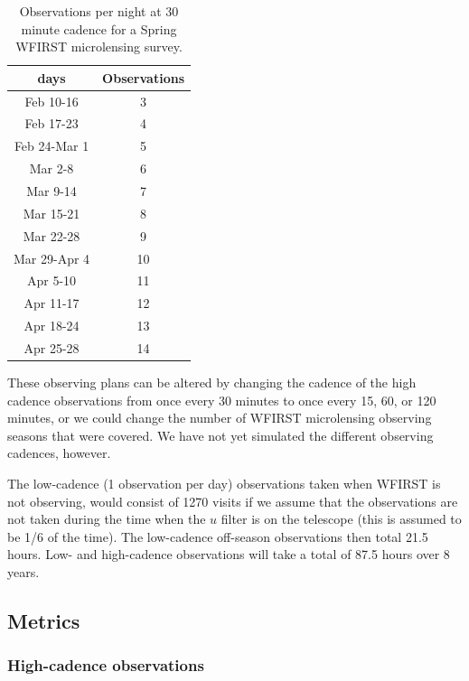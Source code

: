 \begin{table}
\begin{tabular}{ c c }
{\bf days} & {\bf Observations} \\
\hline
Feb 10-16     &  3 \\
Feb 17-23     &  4 \\
Feb 24-Mar 1  &  5 \\
Mar 2-8       &  6 \\
Mar 9-14      &  7 \\
Mar 15-21     &  8 \\
Mar 22-28     &  9 \\
Mar 29-Apr 4  & 10 \\
Apr 5-10      & 11 \\
Apr 11-17     & 12 \\
Apr 18-24     & 13 \\
Apr 25-28     & 14 \\
\end{tabular}
\caption{Observations per night at 30 minute cadence for a Spring
WFIRST microlensing survey.}
\label{tab:wfirst_ml_survey}
\end{table}

These observing plans can be altered by changing the cadence of the high
cadence observations from once every 30 minutes to once every 15, 60,
or 120 minutes, or we could change the number of WFIRST microlensing
observing seasons that were covered. We have not yet simulated the
different observing cadences, however.

The low-cadence (1 observation per day) observations taken when WFIRST
is not observing, would consist of 1270 visits if we assume that
the observations are not taken during the time when the $u$ filter is
on the telescope (this is assumed to be 1/6 of the time). The low-cadence
off-season observations then total 21.5 hours. Low- and high-cadence
observations will take a total of 87.5 hours over 8 years.




\subsection{Metrics}
\label{sec:\secname:metrics}

\subsubsection{High-cadence observations}

